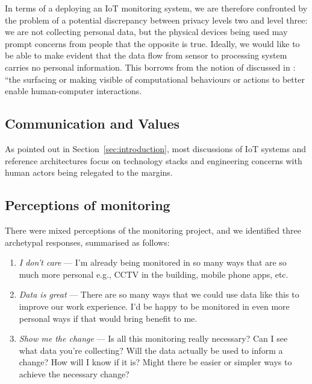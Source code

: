 In terms of a deploying an IoT monitoring system, we are therefore
confronted by the problem of a potential discrepancy between privacy
levels two and level three: we are not collecting personal data, but
the physical devices being used may prompt concerns from people that
the opposite is true. Ideally, we would like to be able to make
evident that the data flow from sensor to processing system carries no
personal information. This borrows from the notion of
 discussed in
\cite{Crabtree-2016-BAIT}: ``the surfacing or making visible of
computational behaviours or actions to better enable human-computer
interactions.

\subsection{Communication and Values}
\label{sec:communication-values}

As pointed out in Section~\ref{sec:introduction}, most discussions of IoT
systems and reference architectures
\cite{Puschel-2016-WIAS,Heidt-2016-PGFT} focus on technology stacks
and engineering concerns with human actors being relegated to the
margins.


\subsection{Perceptions of monitoring}
\label{sec:perc-monit}

There were mixed perceptions of the monitoring project, and we
identified three archetypal responses, summarised as follows: 

\begin{enumerate}
\item \textit{I don't care} --- I'm already being monitored in so many ways
  that are so much more personal e.g., CCTV in the building, mobile
  phone apps, etc. 
\item \textit{Data is great} --- There are so many ways that we could use
  data like this to improve our work experience. I'd
  be happy to be monitored in even more personal ways if that would
  bring benefit to me. 
\item \textit{Show me the change} --- Is all this monitoring really necessary?
  Can I see what data you’re collecting? Will the data actually be
  used to inform a change? How will I know if it is? Might there be
  easier or simpler ways to achieve the necessary change? 
\end{enumerate}

